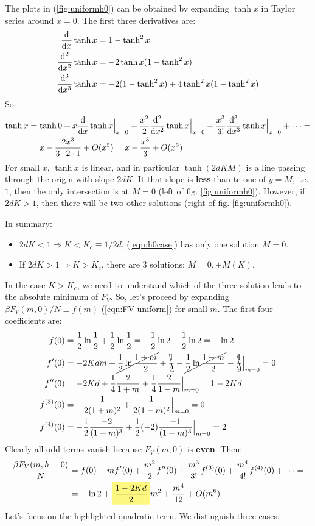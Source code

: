 \documentclass[../../main.tex]{subfiles}
\begin{document}
The plots in (\ref{fig:uniformh0}) can be obtained by expanding $\tanh x$ in Taylor series around $x = 0$. The first three derivatives are:
\begin{align*}
    \dv{x} \tanh x &= 1- \tanh^2 x\\
    \dv[2]{x} \tanh x &= -2 \tanh x(1-\tanh^2 x)\\
    \dv[3]{x} \tanh x &= -2(1-\tanh^2 x ) + 4\tanh^2 x (1-\tanh^2 x)
\end{align*}
So:
\begin{align}\nonumber
    \tanh x &= \tanh 0 +x \dv{x}\tanh x\Big|_{x=0} + \frac{x^2}{2} \dv[2]{x} \tanh x\Big|_{x=0} + \frac{x^3}{3!}\dv[3]{x} \tanh x\Big|_{x=0} + \dots = \\
    &= x -\frac{2x^3}{3\cdot 2 \cdot 1} + O(x^5) = x -\frac{x^3}{3} + O(x^5) 
    \label{eqn:tanh-exp}
\end{align}
For small $x$, $\tanh x$ is linear, and in particular $\tanh(2d K M)$ is a line passing through the origin with slope $2dK$. It that slope is \textbf{less}  than te one of $y=M$, i.e. $1$, then the only intersection is at $M=0$ (left of fig. \ref{fig:uniformh0}). However, if $2dK > 1$, then there will be two other solutions (right of fig. \ref{fig:uniformh0}). 

In summary:
\begin{itemize}
    \item $2dK < 1 \Rightarrow K < K_c \equiv 1/2d$, (\ref{eqn:h0case}) has only one solution $M=0$.
    \item If $2dK > 1 \Rightarrow K > K_c$, there are $3$ solutions: $M=0, \pm M(K)$.
\end{itemize}

In the case $K > K_c$, we need to understand which of the three solution leads to the absolute minimum of $F_V$. So, let's proceed by expanding $\beta F_V(m,0)/N \equiv f(m)$ (\ref{eqn:FV-uniform}) for small $m$. The first four coefficients are:
\begin{align*}
    f(0) &= \frac{1}{2} \ln \frac{1}{2} + \frac{1}{2} \ln \frac{1}{2} = -\frac{1}{2} \ln 2 - \frac{1}{2}\ln 2 = -\ln 2\\
    f'(0) &= -2 K d m + \cancel{\frac{1}{2}\ln \frac{1+m}{2}} + \bcancel{\frac{1}{2}} -\cancel{\frac{1}{2}\ln \frac{1-m}{2}} -\bcancel{\frac{1}{2}} \Big|_{m=0} = 0\\
    f''(0) &= -2Kd +\frac{1}{4}\frac{2}{1+m} +\frac{1}{4}\frac{2}{1-m}\Big|_{m=0} = 1-2Kd    \\
    f^{(3)}(0) &= -\frac{1}{2(1+m)^2} + \frac{1}{2(1-m)^2} \Big|_{m=0} = 0  \\
    f^{(4)}(0) &= -\frac{1}{2}\frac{-2}{(1+m)^3} + \frac{1}{2}(-2)\frac{-1}{(1-m)^3} \Big|_{m=0} = 2    
\end{align*}
Clearly all odd terms vanish because $F_V(m,0)$ is \textbf{even}. Then: 
\begin{align*}
    \frac{\beta F_V(m, h=0)}{N} &= f(0) + mf'(0) + \frac{m^2}{2}f''(0) + \frac{m^3}{3!}f^{(3)}(0) + \frac{m^4}{4!}f^{(4)}(0) + \dots =\\
    &= -\ln 2 +\hlc{Yellow}{\frac{1-2Kd}{2}} m^2  + \frac{m^4}{12} + O(m^6) 
\end{align*}
Let's focus on the highlighted quadratic term. We distinguish three cases:
\end{document}
